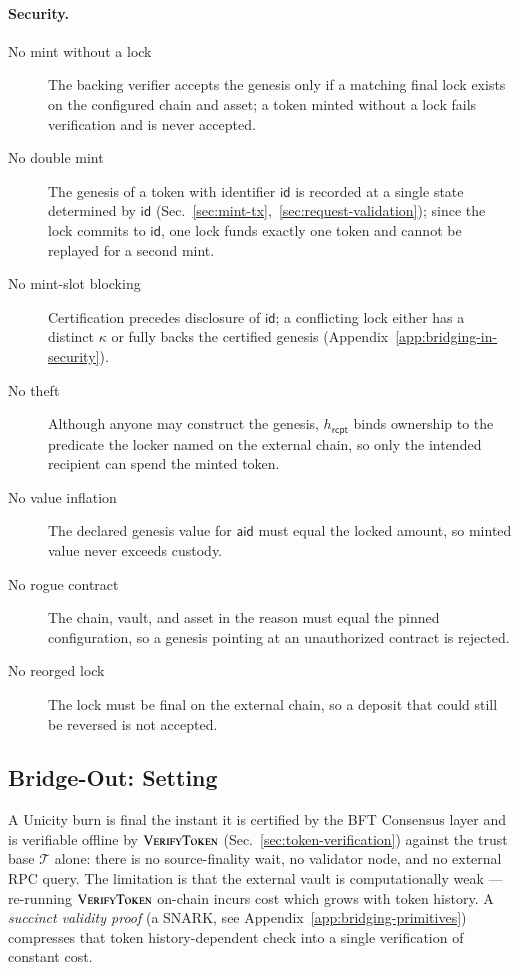 \paragraph{Security.}
\begin{description}
\item[No mint without a lock] The backing verifier accepts the genesis only if a matching final lock exists on the configured chain and asset; a token minted without a lock fails verification and is never accepted.
\item[No double mint] The genesis of a token with identifier $\mathsf{id}$ is recorded at a single state determined by $\mathsf{id}$ (Sec.~\ref{sec:mint-tx},~\ref{sec:request-validation}); since the lock commits to $\mathsf{id}$, one lock funds exactly one token and cannot be replayed for a second mint.
\item[No mint-slot blocking] Certification precedes disclosure of $\mathsf{id}$; a conflicting lock either has a distinct $\kappa$ or fully backs the certified genesis (Appendix~\ref{app:bridging-in-security}).
\item[No theft] Although anyone may construct the genesis, $h_\mathsf{rcpt}$ binds ownership to the predicate the locker named on the external chain, so only the intended recipient can spend the minted token.
\item[No value inflation] The declared genesis value for $\mathsf{aid}$ must equal the locked amount, so minted value never exceeds custody.
\item[No rogue contract] The chain, vault, and asset in the reason must equal the pinned configuration, so a genesis pointing at an unauthorized contract is rejected.
\item[No reorged lock] The lock must be final on the external chain, so a deposit that could still be reversed is not accepted.
\end{description}

\subsection{Bridge-Out: Setting}\label{sec:bridge-setting}

A Unicity burn is final the instant it is certified by the BFT Consensus layer and is verifiable offline by $\Call{VerifyToken}{}$ (Sec.~\ref{sec:token-verification}) against the trust base $\mathcal{T}$ alone: there is no source-finality wait, no validator node, and no external RPC query. The limitation is that the external vault is computationally weak --- re-running $\Call{VerifyToken}{}$ on-chain incurs cost which grows with token history. A \emph{succinct validity proof} (a SNARK, see Appendix~\ref{app:bridging-primitives}) compresses that token history-dependent check into a single verification of constant cost.

